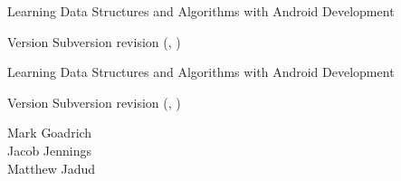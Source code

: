 \documentclass[10pt]{book}
\newcommand{\thetitle}{Learning Data Structures and Algorithms with Android Development}
\newcommand{\theversion}{Subversion revision \svnrev (\svnauthor, \svndate)}
\begin{document}
\frontmatter





\begin{latexonly}

\renewcommand{\blankpage}{\thispagestyle{empty} \quad \newpage}


\thispagestyle{empty}

\begin{flushright}
\vspace*{2.5in}

\begin{spacing}{3}
{\huge \thetitle}
\end{spacing}

\vspace{0.25in}

Version \theversion

\vfill

\end{flushright}


\blankpage
\blankpage

\pagebreak
\thispagestyle{empty}

\begin{flushright}
\vspace*{2.5in}

\begin{spacing}{3}
{\huge \thetitle}
\end{spacing}

\vspace{0.25in}

Version \theversion

\vspace{1in}


{\Large
Mark Goadrich\\
Jacob Jennings\\
Matthew Jadud\\
}


\vspace{0.5in}

\vfill

\end{flushright}



\end{latexonly}
\end{document}
